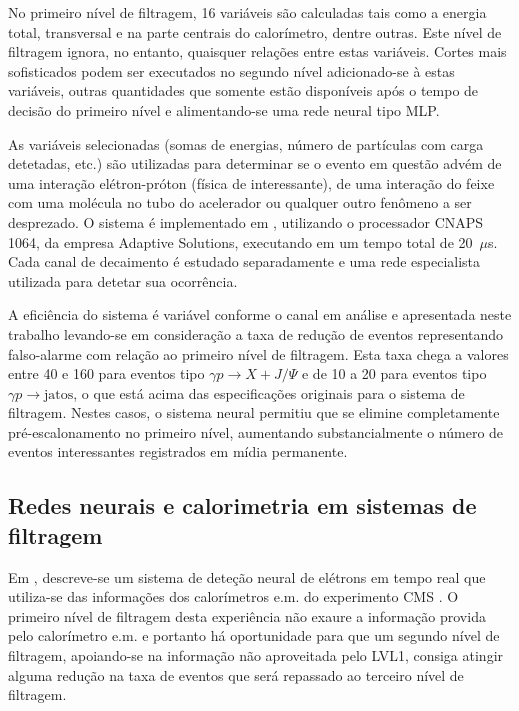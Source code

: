 No primeiro nível de filtragem, 16 variáveis são calculadas tais como a
energia total, transversal e na parte centrais do calorímetro, dentre
outras. Este nível de filtragem ignora, no entanto, quaisquer relações entre
estas variáveis. Cortes mais sofisticados podem ser executados no segundo
nível adicionado-se à estas variáveis, outras quantidades que somente estão
disponíveis após o tempo de decisão do primeiro nível e alimentando-se uma
rede neural tipo MLP.

As variáveis selecionadas (somas de energias, número de partículas com carga
detetadas, etc.) são utilizadas para determinar se o evento em questão advém
de uma interação elétron-próton (física de interessante), de uma interação do
feixe com uma molécula no tubo do acelerador ou qualquer outro fenômeno a ser
desprezado. O sistema é implementado em , utilizando o
processador CNAPS 1064, da empresa Adaptive Solutions, executando em um tempo
total de 20~$\mu$s. Cada canal de decaimento é estudado separadamente e uma
rede especialista utilizada para detetar sua ocorrência.

A eficiência do sistema é variável conforme o canal em análise e apresentada
neste trabalho levando-se em consideração a taxa de redução de eventos
representando falso-alarme com relação ao primeiro nível de filtragem. Esta
taxa chega a valores entre 40 e 160 para eventos tipo $\gamma p \rightarrow X
+ J/\Psi$ e de 10 a 20 para eventos tipo $\gamma p \rightarrow \text{jatos}$,
o que está acima das especificações originais para o sistema de
filtragem. Nestes casos, o sistema neural permitiu que se elimine
completamente pré-escalonamento no primeiro nível, aumentando
substancialmente o número de eventos interessantes registrados em mídia
permanente.

\subsection{Redes neurais e calorimetria em sistemas de filtragem}

Em \cite{varela-cms-1998}, descreve-se um sistema de deteção neural de
elétrons em tempo real que utiliza-se das informações dos calorímetros e.m. do
experimento CMS \cite{cms-trigger}. O primeiro nível de filtragem desta
experiência não exaure a informação provida pelo calorímetro e.m. e portanto
há oportunidade para que um segundo nível de filtragem, apoiando-se na
informação não aproveitada pelo LVL1, consiga atingir alguma redução na taxa
de eventos que será repassado ao terceiro nível de filtragem.

